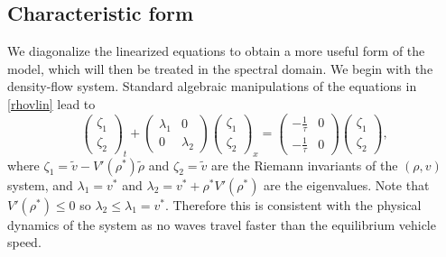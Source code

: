 \documentclass[preprint]{elsarticle}
\begin{document}
\subsection{Characteristic form}
We diagonalize the linearized equations to obtain a more useful form of the model, which will then be treated in the spectral domain. 
We begin with the density-flow system. Standard algebraic manipulations of the equations in \eqref{rhovlin} lead to
\begin{equation}
\begin{pmatrix}
\zeta_1 \\ \zeta_2
\end{pmatrix}_t
+ \begin{pmatrix}
\lambda_1 & 0 \\
0 & \lambda_2 
\end{pmatrix}
\begin{pmatrix}
\zeta_1 \\ \zeta_2
\end{pmatrix}_x
= \begin{pmatrix}
-\frac{1}{\tau} & 0 \\
-\frac{1}{\tau} & 0
\end{pmatrix}
\begin{pmatrix}
\zeta_1 \\ \zeta_2
\end{pmatrix},
\end{equation}
where $\zeta_1 = \tilde{v} - V'( \rho^* )\tilde{\rho}$ and $\zeta_2 = \tilde{v}$ are the Riemann invariants of the $(\rho, v)$ system, and $\lambda_1 = v^*$ and $\lambda_2 = v^* + \rho^* V'( \rho^*)$ are the eigenvalues. Note that $V'( \rho^*) \leq 0$ so $\lambda_2 \leq \lambda_1 = v^*$. Therefore this is consistent with the physical dynamics of the system as no waves travel faster than the equilibrium vehicle speed. 
\end{document}
